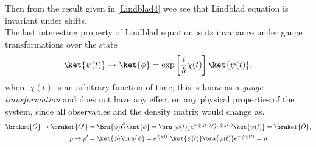 \begin{appendix}
\begin{equation}
\end{equation}
Then from the result given in \eqref{Lindblad4} wee see that Lindblad equation is invariant under shifts.\\
The last interesting property of Lindblad equation is its invariance under gauge transformations over the state
\begin{equation}
\ket{\psi(t)}\rightarrow\ket{\phi}=\text{exp}\left[\frac{i}{\hbar}\chi(t)\right]\ket{\psi(t)},
\label{Lindblad5}
\end{equation}
where $\chi(t)$ is an arbitrary function of time, this is know as a \textit{gauge transformation} and does not have any effect on any physical properties of the system, since all observables and the density matrix would change as.
\begin{align}
\braket{\hat{O}}\rightarrow\braket{\hat{O}'}&=\bra{\phi}\hat{O}\ket{\phi}=\bra{\psi(t)}e^{-\frac{i}{\hbar}\chi(t)}\hat{O}e^{\frac{i}{\hbar}\chi(t)}\ket{\psi(t)}=\braket{\hat{O}},\\
\rho\rightarrow\rho'&=\ket{\phi}\bra{\phi}=e^{\frac{i}{\hbar}\chi(t)}\ket{\psi(t)}\bra{\psi(t)}e^{-\frac{i}{\hbar}\chi(t)}=\rho.
\end{align}




\end{appendix}